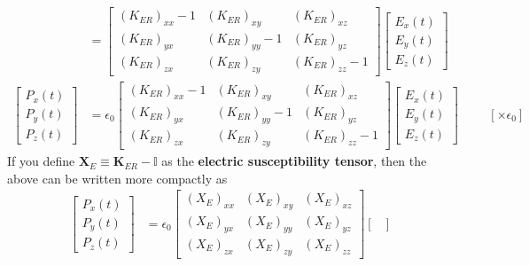 \begin{itemize}
\begin{align*}
      &=
      \begin{bmatrix}
        (K_{ER})_{xx} - 1 & (K_{ER})_{xy} & (K_{ER})_{xz} \\
        (K_{ER})_{yx} & (K_{ER})_{yy} - 1 & (K_{ER})_{yz} \\
        (K_{ER})_{zx} & (K_{ER})_{zy} & (K_{ER})_{zz} - 1
      \end{bmatrix}
      \begin{bmatrix}
        E_x(t) \\
        E_y(t) \\
        E_z(t)
      \end{bmatrix} \\
      \begin{bmatrix}
        P_x(t) \\
        P_y(t) \\
        P_z(t)
      \end{bmatrix}
      &= \epsilon_0
      \begin{bmatrix}
        (K_{ER})_{xx} - 1 & (K_{ER})_{xy} & (K_{ER})_{xz} \\
        (K_{ER})_{yx} & (K_{ER})_{yy} - 1 & (K_{ER})_{yz} \\
        (K_{ER})_{zx} & (K_{ER})_{zy} & (K_{ER})_{zz} - 1
      \end{bmatrix}
      \begin{bmatrix}
        E_x(t) \\
        E_y(t) \\
        E_z(t)
      \end{bmatrix} \hspace{1cm} \left[\times \epsilon_0\right]
    \end{align*}
    If you define \( \mathbf{X}_E \equiv \mathbf{K}_{ER} - \mathbb{I} \) as the
  \textbf{electric susceptibility tensor}, then the above can be written more compactly as
    \begin{align*}
      \begin{bmatrix}
        P_x(t) \\
        P_y(t) \\
        P_z(t)
      \end{bmatrix}
      &= \epsilon_0
      \begin{bmatrix}
        (X_E)_{xx} & (X_E)_{xy} & (X_E)_{xz} \\
        (X_E)_{yx} & (X_E)_{yy} & (X_E)_{yz} \\
        (X_E)_{zx} & (X_E)_{zy} & (X_E)_{zz}
      \end{bmatrix}
      \begin{bmatrix}

\end{bmatrix}
\end{align*}
\end{itemize}
